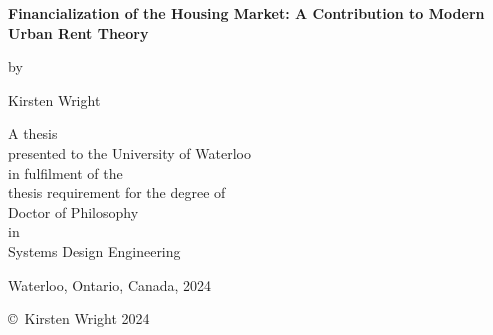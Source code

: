 \pagestyle{empty}

\begin{titlepage}
        \begin{center}
        \vspace*{1.0cm}

        \Huge
        {\bf Financialization of the Housing Market: A Contribution to Modern Urban Rent Theory}

        \vspace*{1.0cm}

        \normalsize
        by \\

        \vspace*{1.0cm}

        \Large
        Kirsten Wright \\

        \vspace*{3.0cm}

        \normalsize
        A thesis \\
        presented to the University of Waterloo \\ 
        in fulfilment of the \\
        thesis requirement for the degree of \\
        Doctor of Philosophy \\
        in \\
        Systems Design Engineering \\

        \vspace*{2.0cm}

        Waterloo, Ontario, Canada, 2024 \\

        \vspace*{1.0cm}

        \copyright\ Kirsten Wright 2024 \\
        \end{center}
\end{titlepage}

\pagestyle{plain}
\setcounter{page}{2}

\cleardoublepage %
 
